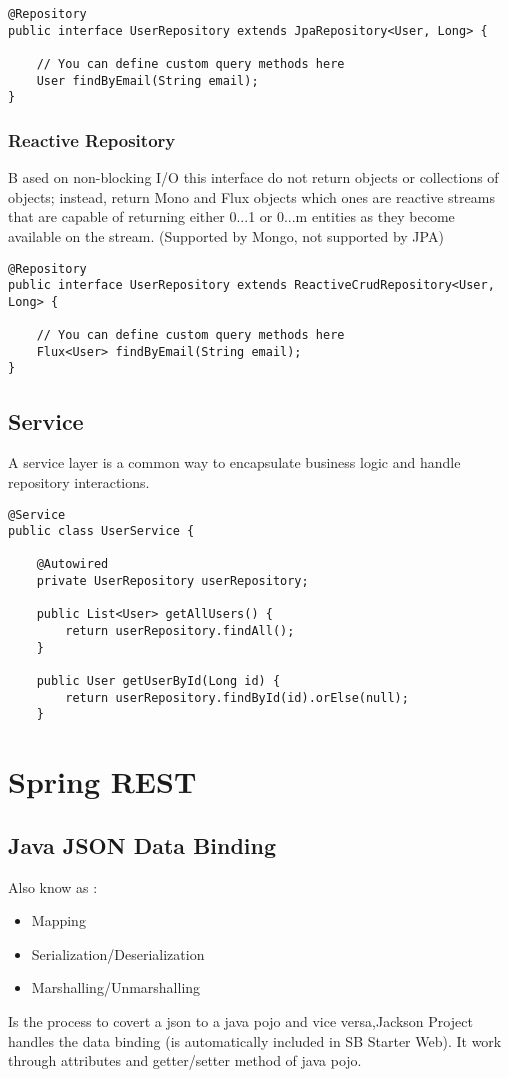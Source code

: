 \documentclass[a4paper, 12pt]{article}
\begin{document}
    \begin{lstlisting}
@Repository
public interface UserRepository extends JpaRepository<User, Long> {

    // You can define custom query methods here
    User findByEmail(String email);
}
    \end{lstlisting}

    \subsubsection{Reactive Repository}
    B ased on non-blocking I/O this interface do not
    return objects or collections of objects; instead, return Mono and Flux objects which ones are reactive streams that are
    capable of returning either 0...1 or 0...m entities as they become available on the stream. (Supported by Mongo, not supported by JPA)
    \begin{lstlisting}
@Repository
public interface UserRepository extends ReactiveCrudRepository<User, Long> {

    // You can define custom query methods here
    Flux<User> findByEmail(String email);
}
    \end{lstlisting}

    \subsection{Service}
    A service layer is a common way to encapsulate business logic and handle repository interactions.
    \begin{lstlisting}
@Service
public class UserService {

    @Autowired
    private UserRepository userRepository;

    public List<User> getAllUsers() {
        return userRepository.findAll();
    }

    public User getUserById(Long id) {
        return userRepository.findById(id).orElse(null);
    }
    \end{lstlisting}
    \newpage


    \section{Spring REST}

    \subsection{Java JSON Data Binding}
    Also know as :
    \begin{itemize}
        \item Mapping
        \item Serialization/Deserialization
        \item Marshalling/Unmarshalling
    \end{itemize}
    Is the process to covert a json to a java pojo and vice versa,Jackson Project handles the data binding (is automatically included in SB Starter Web). It work through attributes and getter/setter method of java pojo.
\end{document}
